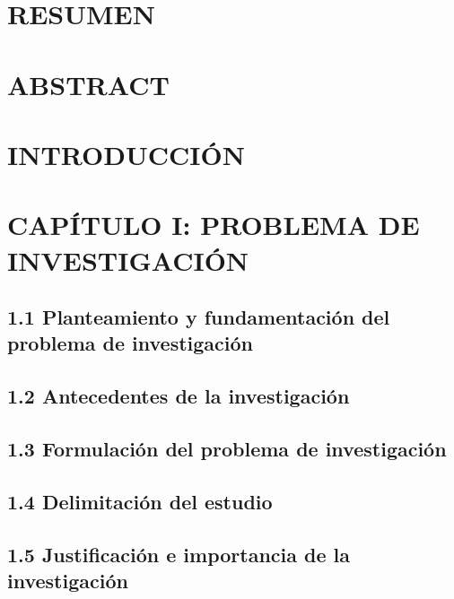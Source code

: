 \documentclass[12pt]{../componentes/uns}
\begin{document}
\newpage
\tableofcontents
\newpage

\listoftables
\newpage

\listoffigures
\newpage

\section*{RESUMEN}
\lipsum[3] %

\section*{ABSTRACT}
\lipsum[4] %

\newpage
\section{INTRODUCCIÓN}
\lipsum[5]

\newpage
\section{CAPÍTULO I: PROBLEMA DE INVESTIGACIÓN}
\subsection{1.1 Planteamiento y fundamentación del problema de investigación}
\lipsum[6]

\subsection{1.2 Antecedentes de la investigación}
\lipsum[7]

\subsection{1.3 Formulación del problema de investigación}
\lipsum[8]

\subsection{1.4 Delimitación del estudio}
\lipsum[9]

\subsection{1.5 Justificación e importancia de la investigación}
\lipsum[10]
\end{document}
